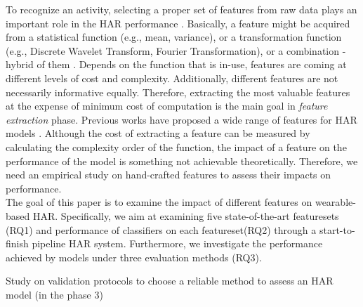 \documentclass[journal,article,submit,moreauthors,pdftex]{Definitions/mdpi}
\begin{document}


To recognize an activity, selecting a proper set of features from raw data plays an important role in the HAR performance \cite{zhang2013human}. Basically, a feature might be acquired from a statistical function (e.g., mean, variance), or a transformation function (e.g., Discrete Wavelet Transform, Fourier Transformation), or a combination - hybrid of them \cite{wang2019survey}. Depends on the function that is in-use, features are coming at different levels of cost and complexity. Additionally, different features are not necessarily informative equally. Therefore, extracting the most valuable features at the expense of minimum cost of computation is the main goal in \textit{feature extraction} phase. Previous works have proposed a wide range of features for HAR models \cite{janidarmian2017comprehensive, wang2019survey}. Although the cost of extracting a feature can be measured by calculating the complexity order of the function, the impact of a feature on the performance of the model is something not achievable theoretically\cite{rosati2018comparison}. Therefore, we need an empirical study on hand-crafted features to assess their impacts on performance.\\
The goal of this paper is to examine the impact of different features on wearable-based HAR. Specifically, we aim at examining five state-of-the-art featuresets (RQ1) and performance of classifiers on each featureset(RQ2) through a start-to-finish pipeline HAR system. Furthermore, we investigate the performance achieved by models under three evaluation methods (RQ3).


Study on validation protocols to choose a reliable method to assess an HAR model \cite{jordao2018human}(in the phase 3)
\end{document}
